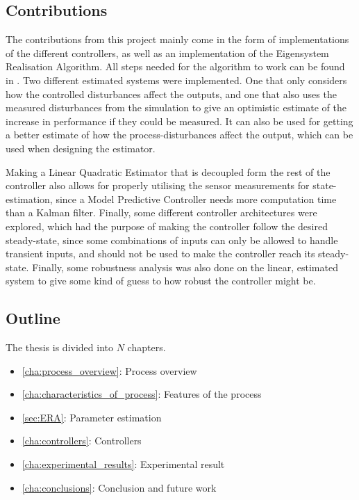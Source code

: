 \subsection{Contributions}
The contributions from this project mainly come in the form of implementations of the different controllers, as well as an implementation of the Eigensystem Realisation Algorithm. All steps needed for the algorithm to work can be found in \cite{ERA_source}. Two different estimated systems were implemented. One that only considers how the controlled disturbances affect the outputs, and one that also uses the measured disturbances from the simulation to give an optimistic estimate of the increase in performance if they could be measured. It can also be used for getting a better estimate of how the process-disturbances affect the output, which can be used when designing the estimator. 

\noindent
Making a Linear Quadratic Estimator that is decoupled form the rest of the controller also allows for properly utilising the sensor measurements for state-estimation, since a Model Predictive Controller needs more computation time than a Kalman filter. 
\noindent
Finally, some different controller architectures were explored, which had the purpose of making the controller follow the desired steady-state, since some combinations of inputs can only be allowed to handle transient inputs, and should not be used to make the controller reach its steady-state. Finally, some robustness analysis was also done on the linear, estimated system to give some kind of guess to how robust the controller might be. 

\subsection{Outline}
The thesis is divided into $N$ chapters. 

\begin{itemize}
  \item \ref{cha:process_overview}: Process overview 
  \item \ref{cha:characteristics_of_process}: Features of the process 
  \item \ref{sec:ERA}: Parameter estimation
  \item \ref{cha:controllers}: Controllers
  \item \ref{cha:experimental_results}: Experimental result
  \item \ref{cha:conclusions}: Conclusion and future work
\end{itemize}




